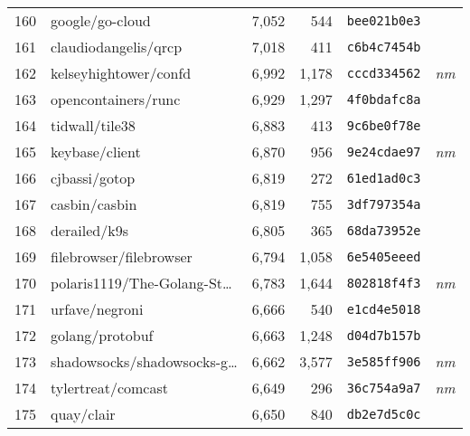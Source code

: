 {\begin{supertabular}{llrrll}
        160 &                    google/go-cloud &  7,052 &    544 &  \texttt{bee021b0e3} &              \\
        161 &               claudiodangelis/qrcp &  7,018 &    411 &  \texttt{c6b4c7454b} &              \\
        162 &              kelseyhightower/confd &  6,992 &  1,178 &  \texttt{cccd334562} &  \textit{nm} \\
        163 &                opencontainers/runc &  6,929 &  1,297 &  \texttt{4f0bdafc8a} &              \\
        164 &                     tidwall/tile38 &  6,883 &    413 &  \texttt{9c6be0f78e} &              \\
        165 &                     keybase/client &  6,870 &    956 &  \texttt{9e24cdae97} &  \textit{nm} \\
        166 &                      cjbassi/gotop &  6,819 &    272 &  \texttt{61ed1ad0c3} &              \\
        167 &                      casbin/casbin &  6,819 &    755 &  \texttt{3df797354a} &              \\
        168 &                       derailed/k9s &  6,805 &    365 &  \texttt{68da73952e} &              \\
        169 &            filebrowser/filebrowser &  6,794 &  1,058 &  \texttt{6e5405eeed} &              \\
        170 &    polaris1119/The-Golang-St\ldots &  6,783 &  1,644 &  \texttt{802818f4f3} &  \textit{nm} \\
        171 &                     urfave/negroni &  6,666 &    540 &  \texttt{e1cd4e5018} &              \\
        172 &                    golang/protobuf &  6,663 &  1,248 &  \texttt{d04d7b157b} &              \\
        173 &    shadowsocks/shadowsocks-g\ldots &  6,662 &  3,577 &  \texttt{3e585ff906} &  \textit{nm} \\
        174 &                 tylertreat/comcast &  6,649 &    296 &  \texttt{36c754a9a7} &  \textit{nm} \\
        175 &                         quay/clair &  6,650 &    840 &  \texttt{db2e7d5c0c} &              \\

\end{supertabular}}
